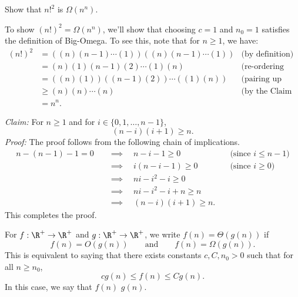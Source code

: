\begin{flex}
\begin{exercise}  \label{exercise:Practice-with-big-Omega}
Show that $n!^2$ is $\Omega(n^n)$.
\end{exercise}

\begin{solution}
To show $(n!)^2 = \Omega(n^n)$, we'll show that choosing $c = 1$ and $n_0=1$ satisfies the definition of Big-Omega. To see this, note that for $n \geq 1$, we have:
\begin{align*}
(n!)^2 & = \left((n)(n-1)\cdots (1)\right) \left((n)(n-1) \cdots (1)\right) & \text{(by definition)}\\ 
& = (n)(1)(n-1)(2) \cdots (1)(n) & \text{(re-ordering terms)}\\
& = ((n)(1))((n-1)(2)) \cdots ((1)(n)) & \text{(pairing up consecutive terms)} \\
& \geq (n)(n) \cdots (n) & \text{(by the Claim below)}\\
& = n^n.
\end{align*}

\noindent
\emph{Claim:} For $n \geq 1$ and for $i \in \{0,1,\ldots,n-1\}$,
\[
(n-i)(i+1) \geq n.
\]
\emph{Proof:} The proof follows from the following chain of implications. 
\begin{align*}
n - (n-1) - 1 = 0 & \quad \implies \quad n-i-1 \geq 0 & \quad \text{(since $i \leq n-1$)} \\ 
& \quad \implies \quad i(n-i-1)  \geq 0  & \quad \text{(since $i \geq 0$)} \\
& \quad \implies \quad ni - i^2 - i \geq 0 & \\
& \quad \implies \quad ni - i^2 - i + n \geq n & \\
& \quad \implies \quad (n-i)(i+1) \geq n. &
\end{align*}
This completes the proof.
\end{solution}
\end{flex}


\begin{definition}[Theta] \label{definition:Theta}
For $f: \R^+ \to \R^+$ and $g: \R^+ \to \R^+$, we write $f(n) = \Theta(g(n))$ if
\[
f(n) = O(g(n)) \quad \quad \text{and} \quad \quad f(n) = \Omega(g(n)).
\]
This is equivalent to saying that there exists constants $c,C,n_0 > 0$ such that for all $n \geq n_0$,
\[
cg(n) \leq f(n) \leq Cg(n).
\]
In this case, we say that $f(n)$  $g(n)$.
\end{definition}


